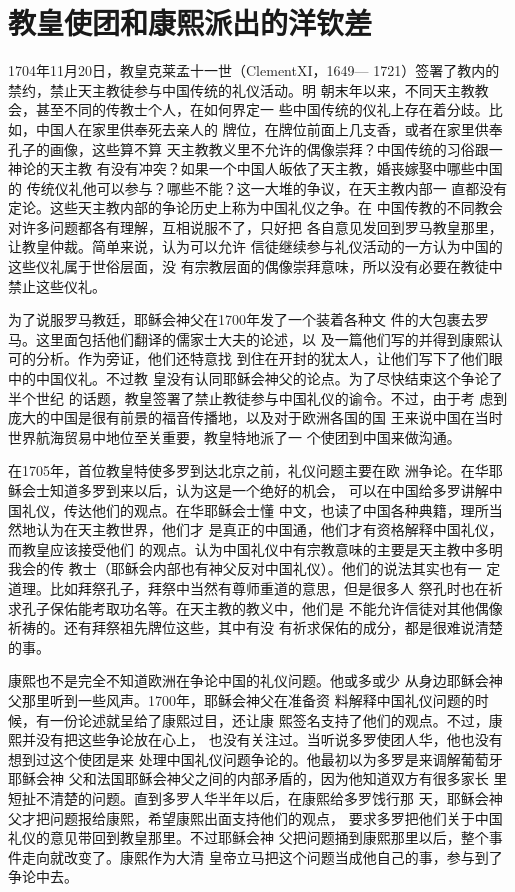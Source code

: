 \section{教皇使团和康熙派出的洋钦差}
\par
1704年11月20日，教皇克莱孟十一世（ClementXI，1649—%
1721）签署了教内的禁约，禁止天主教徒参与中国传统的礼仪活动。明%
朝末年以来，不同天主教教会，甚至不同的传教士个人，在如何界定一%
些中国传统的仪礼上存在着分歧。比如，中国人在家里供奉死去亲人的%
牌位，在牌位前面上几支香，或者在家里供奉孔子的画像，这些算不算%
天主教教义里不允许的偶像崇拜？中国传统的习俗跟一神论的天主教%
有没有冲突？如果一个中国人皈依了天主教，婚丧嫁娶中哪些中国的%
传统仪礼他可以参与？哪些不能？这一大堆的争议，在天主教内部一%
直都没有定论。这些天主教内部的争论历史上称为中国礼仪之争。在%
中国传教的不同教会对许多问题都各有理解，互相说服不了，只好把%
各自意见发回到罗马教皇那里，让教皇仲裁。简单来说，认为可以允许%
信徒继续参与礼仪活动的一方认为中国的这些仪礼属于世俗层面，没%
有宗教层面的偶像崇拜意味，所以没有必要在教徒中禁止这些仪礼。%
\par
为了说服罗马教廷，耶稣会神父在1700年发了一个装着各种文%
件的大包裹去罗马。这里面包括他们翻译的儒家士大夫的论述，以%
及一篇他们写的并得到康熙认可的分析。作为旁证，他们还特意找%
到住在开封的犹太人，让他们写下了他们眼中的中国仪礼。不过教%
皇没有认同耶稣会神父的论点。为了尽快结束这个争论了半个世纪%
的话题，教皇签署了禁止教徒参与中国礼仪的谕令。不过，由于考%
虑到庞大的中国是很有前景的福音传播地，以及对于欧洲各国的国%
王来说中国在当时世界航海贸易中地位至关重要，教皇特地派了一%
个使团到中国来做沟通。%
\par
在1705年，首位教皇特使多罗到达北京之前，礼仪问题主要在欧%
洲争论。在华耶稣会士知道多罗到来以后，认为这是一个绝好的机会，%
可以在中国给多罗讲解中国礼仪，传达他们的观点。在华耶稣会士懂%
中文，也读了中国各种典籍，理所当然地认为在天主教世界，他们才%
是真正的中国通，他们才有资格解释中国礼仪，而教皇应该接受他们%
的观点。认为中国礼仪中有宗教意味的主要是天主教中多明我会的传%
教士（耶稣会内部也有神父反对中国礼仪）。他们的说法其实也有一%
定道理。比如拜祭孔子，拜祭中当然有尊师重道的意思，但是很多人%
祭孔时也在祈求孔子保佑能考取功名等。在天主教的教义中，他们是%
不能允许信徒对其他偶像祈祷的。还有拜祭祖先牌位这些，其中有没%
有祈求保佑的成分，都是很难说清楚的事。%
\par
康熙也不是完全不知道欧洲在争论中国的礼仪问题。他或多或少%
从身边耶稣会神父那里听到一些风声。1700年，耶稣会神父在准备资%
料解释中国礼仪问题的时候，有一份论述就呈给了康熙过目，还让康%
熙签名支持了他们的观点。不过，康熙并没有把这些争论放在心上，%
也没有关注过。当听说多罗使团人华，他也没有想到过这个使团是来%
处理中国礼仪问题争论的。他最初以为多罗是来调解葡萄牙耶稣会神%
父和法国耶稣会神父之间的内部矛盾的，因为他知道双方有很多家长%
里短扯不清楚的问题。直到多罗人华半年以后，在康熙给多罗饯行那%
天，耶稣会神父才把问题报给康熙，希望康熙出面支持他们的观点，%
要求多罗把他们关于中国礼仪的意见带回到教皇那里。不过耶稣会神%
父把问题捅到康熙那里以后，整个事件走向就改变了。康熙作为大清%
皇帝立马把这个问题当成他自己的事，参与到了争论中去。%
